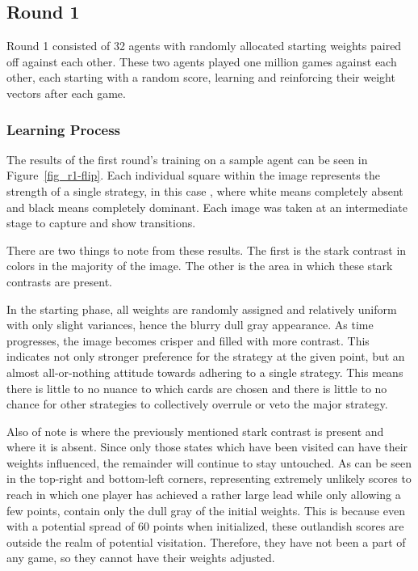 

\subsection{Round 1}


Round 1 consisted of 32 agents with randomly allocated starting weights
paired off against each other.
%
These two agents played one million games against each other,
each starting with a random score,
learning and reinforcing their weight vectors after each game.

\subsubsection{Learning Process}


The results of the first round's training on a sample agent can be seen
in Figure~\ref{fig_r1-flip}.
%
Each individual square within the image represents the strength of a single
strategy,
in this case \handmaxavg,
where white means completely absent and black means completely dominant.
%
Each image was taken at an intermediate stage to capture and show transitions.

There are two things to note from these results.
%
The first is the stark contrast in colors in the majority of the image.
%
The other is the area in which these stark contrasts are present.

In the starting phase,
all weights are randomly assigned and relatively uniform with only slight
variances,
hence the blurry dull gray appearance.
%
As time progresses,
the image becomes crisper and filled with more contrast.
%
This indicates not only stronger preference for the strategy at the given
point,
but an almost all-or-nothing attitude towards adhering to a single strategy.
%
This means there is little to no nuance to which cards are chosen
and there is little to no chance for other strategies to collectively overrule 
or veto the major strategy.

Also of note is where the previously mentioned stark contrast is present and
where it is absent.
%
Since only those states which have been visited can have their weights
influenced,
the remainder will continue to stay untouched.
%
As can be seen in the top-right and bottom-left corners,
representing extremely unlikely scores to reach in which one player has
achieved a rather large lead while only allowing a few points,
contain only the dull gray of the initial weights.
%
This is because even with a potential spread of 60 points when initialized,
these outlandish scores are outside the realm of potential visitation.
%
Therefore, they have not been a part of any game,
so they cannot have their weights adjusted.

